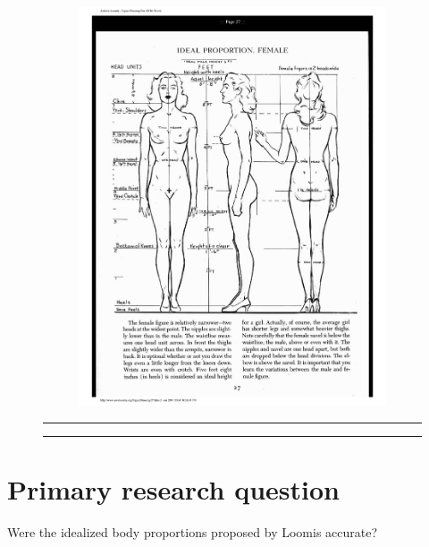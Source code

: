 \documentclass[]{article}
\begin{document}
\begin{figure}[!ht]
\begin{subfigure}[h]{0.5\textwidth}
        \caption{ \citet{harris:2000} }
        \label{fig:sub-first}
    \end{subfigure}
    \begin{subfigure}[h]{0.5\textwidth}
    \centering
        \includegraphics{figures/Loomis2.pdf}
            \caption{\citet{harris:2000}}
        \label{fig:sub-second}
    \end{subfigure}
    \vspace{2.5mm}
    \hrule
    \vspace{2.5mm}
        \caption{ }
        \label{fig:combined}
    \vspace{-2.5mm}
    \hrule
\end{figure}

\section{Primary research question}
\label{sec:rq}

Were the idealized body proportions proposed by Loomis accurate?
\end{document}
